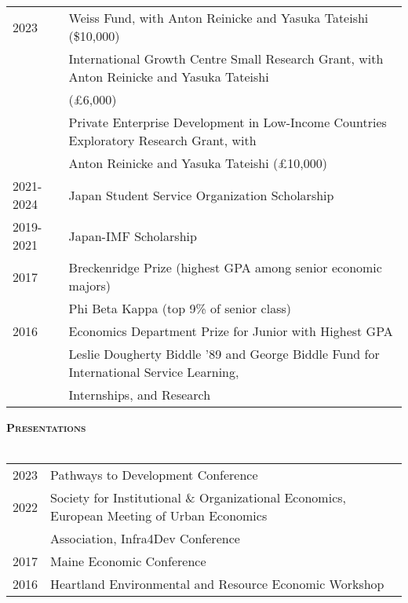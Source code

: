 \documentclass[11pt]{article}
\newcommand{\lineunder}{\vspace*{-8pt} \\ \hspace*{-18pt} \hrulefill \\}
\newcommand{\header}[1]{{\hspace*{-15pt}\vspace*{6pt} \textsc{#1}} \vspace*{-6pt} \lineunder}
\begin{document}
\begin{tabular}{l @{\hspace{4.5ex}} l }
2023 & Weiss Fund, with Anton Reinicke and Yasuka Tateishi (\$10,000) \\
& International Growth Centre Small Research Grant, with Anton Reinicke and Yasuka Tateishi \\
& (£6,000) \\
& Private Enterprise Development in Low-Income Countries Exploratory Research Grant, with \\
 & Anton Reinicke and Yasuka Tateishi (£10,000) \\
2021-2024 & Japan Student Service Organization Scholarship \\
2019-2021 & Japan-IMF Scholarship \\
2017 & Breckenridge Prize (highest GPA among senior economic majors) \\
& Phi Beta Kappa (top 9\% of senior class) \\
2016 & Economics Department Prize for Junior with Highest GPA \\
& Leslie Dougherty Biddle '89 and George Biddle Fund for International Service Learning, \\
& Internships, and Research \\
\end{tabular}
\vspace{2mm}
\hfill{}

\clearpage %


\header{\textbf{Presentations}}
\vspace{2mm}

\begin{tabular}{l @{\hspace{10ex}} l }
	2023 & Pathways to Development Conference \\
	2022 & Society for Institutional \& Organizational Economics, European Meeting of Urban Economics \\
	& Association, Infra4Dev Conference \\
	2017 & Maine Economic Conference \\
	2016 & Heartland Environmental and Resource Economic Workshop  \\
\end{tabular}
\vspace{2mm}
\hfill{}
\vspace{3mm}


\end{document}
